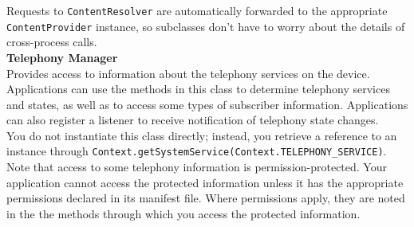 \hspace*{0.82cm}Requests to \texttt{ContentResolver} are automatically forwarded to the appropriate \texttt{ContentProvider} instance, 
so subclasses don't have to worry about the details of cross-process calls.\\[1cm]
\textbf{Telephony Manager}\\
\hspace*{0.82cm}Provides access to information about the telephony services on the device. Applications can use the methods in this class to 
determine telephony services and states, as well as to access some types of subscriber information. Applications can also register a listener 
to receive notification of telephony state changes.\\[0.5cm]
\hspace*{0.82cm}You do not instantiate this class directly; instead, you retrieve a reference to an instance through 
\texttt{Context.getSystemService(Context.TELEPHONY\_SERVICE)}.\\[0.5cm]
\hspace*{0.82cm}Note that access to some telephony information is permission-protected. Your application cannot access the protected 
information unless it has the appropriate permissions declared in its manifest file. Where permissions apply, they are noted in the 
the methods through which you access the protected information.
